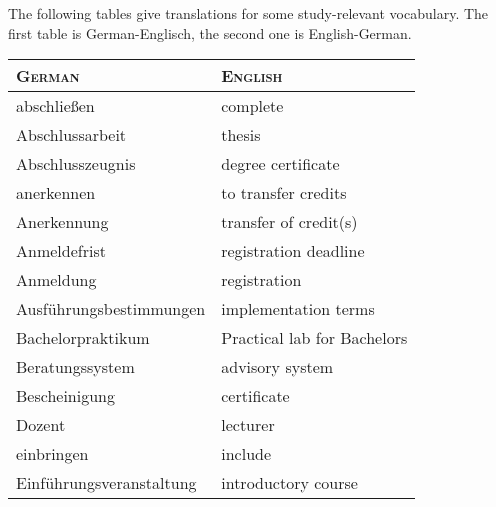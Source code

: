 
The following tables give translations for some study-relevant vocabulary.
The first table is German-Englisch, the second one is English-German.

\begin{longtable} {|p{.5\linewidth}|p{.5\linewidth}|}
    \hline
    \textsc{German}                     & \textsc{English}                                               \\
    \hline
    \hline
    abschließen                         & complete                                                       \\
    \hline
    Abschlussarbeit                     & thesis                                                         \\
    \hline
    Abschlusszeugnis                    & degree certificate                                             \\
    \hline
    anerkennen                          & to transfer credits                                            \\
    \hline
    Anerkennung                         & transfer of credit(s)                                          \\
    \hline
    Anmeldefrist                        & registration deadline                                          \\
    \hline
    Anmeldung                           & registration                                                   \\
    \hline
    Ausführungsbestimmungen             & implementation terms                                           \\
    \hline
    Bachelorpraktikum                   & Practical lab for Bachelors                                    \\
    \hline
    Beratungssystem                     & advisory system                                                \\
    \hline
    Bescheinigung                       & certificate                                                    \\
    \hline
    Dozent                              & lecturer                                                       \\
    \hline
    einbringen                          & include                                                        \\
    \hline
    Einführungsveranstaltung            & introductory course                                            \\

\end{longtable}
